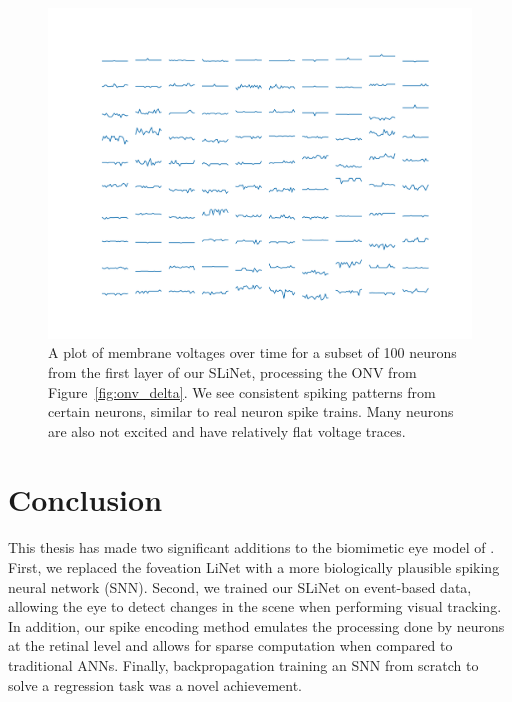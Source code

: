 \documentclass [MS] {UCLAthesis}
\begin{document}


\begin{figure}
    \centering
    \includegraphics[width=1.0\textwidth]{spike_traces}
    \caption[Sample membrane voltage traces]{A plot of membrane voltages over time for a subset of 100 neurons from the first layer of our SLiNet, processing the ONV from Figure~\ref{fig:onv_delta}. We see consistent spiking patterns from certain neurons, similar to real neuron spike trains. Many neurons are also not excited and have relatively flat voltage traces.}
    \label{fig:spike_traces}
\end{figure}



\chapter{Conclusion}

This thesis has made two significant additions to the biomimetic eye model of \citet{Masaki, Arjun_thesis, Masaki_linet}. First, we replaced the foveation LiNet with a more biologically plausible spiking neural network (SNN). Second, we trained our SLiNet on event-based data, allowing the eye to detect changes in the scene when performing visual tracking. In addition, our spike encoding method emulates the processing done by neurons at the retinal level and allows for sparse computation when compared to traditional ANNs. Finally, backpropagation training an SNN from scratch to solve a regression task was a novel achievement. 
\end{document}
